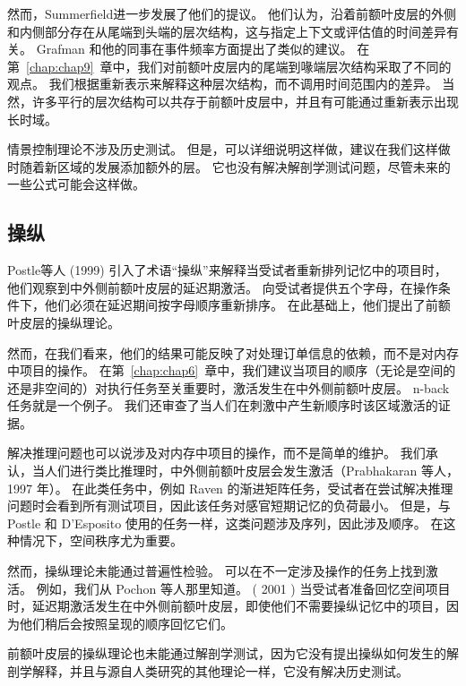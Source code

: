 然而，Summerfield\cite{summerfield2009decision}进一步发展了他们的提议。
他们认为，沿着前额叶皮层的外侧和内侧部分存在从尾端到头端的层次结构，这与指定上下文或评估值的时间差异有关。
Grafman 和他的同事\cite{krueger2007event}在事件频率方面提出了类似的建议。
在第~\ref{chap:chap9}~章中，我们对前额叶皮层内的尾端到喙端层次结构采取了不同的观点。
我们根据重新表示来解释这种层次结构，而不调用时间范围内的差异。
当然，许多平行的层次结构可以共存于前额叶皮层中，并且有可能通过重新表示出现长时域。
\par


情景控制理论不涉及历史测试。
但是，可以详细说明这样做，建议在我们这样做时随着新区域的发展添加额外的层。
它也没有解决解剖学测试问题，尽管未来的一些公式可能会这样做。



\subsection{操纵}

Postle等人 (1999) 引入了术语“操纵”来解释当受试者重新排列记忆中的项目时，他们观察到中外侧前额叶皮层的延迟期激活。 向受试者提供五个字母，在操作条件下，他们必须在延迟期间按字母顺序重新排序。 在此基础上，他们提出了前额叶皮层的操纵理论。
\par 
然而，在我们看来，他们的结果可能反映了对处理订单信息的依赖，而不是对内存中项目的操作。 在第~\ref{chap:chap6}~章中，我们建议当项目的顺序（无论是空间的还是非空间的）对执行任务至关重要时，激活发生在中外侧前额叶皮层。 n-back 任务就是一个例子。 我们还审查了当人们在刺激中产生新顺序时该区域激活的证据。
\par 
解决推理问题也可以说涉及对内存中项目的操作，而不是简单的维护。 我们承认，当人们进行类比推理时，中外侧前额叶皮层会发生激活（Prabhakaran 等人，1997 年）。 在此类任务中，例如 Raven 的渐进矩阵任务，受试者在尝试解决推理问题时会看到所有测试项目，因此该任务对感官短期记忆的负荷最小。 但是，与 Postle 和 D'Esposito 使用的任务一样，这类问题涉及序列，因此涉及顺序。 在这种情况下，空间秩序尤为重要。
\par 
然而，操纵理论未能通过普遍性检验。 可以在不一定涉及操作的任务上找到激活。 例如，我们从 Pochon 等人那里知道。 ( 2001 ) 当受试者准备回忆空间项目时，延迟期激活发生在中外侧前额叶皮层，即使他们不需要操纵记忆中的项目，因为他们稍后会按照呈现的顺序回忆它们。
\par 
前额叶皮层的操纵理论也未能通过解剖学测试，因为它没有提出操纵如何发生的解剖学解释，并且与源自人类研究的其他理论一样，它没有解决历史测试。
